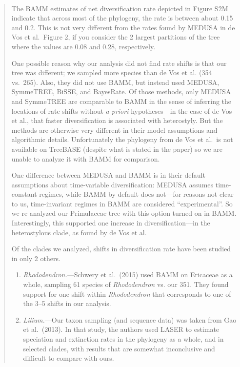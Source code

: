 \documentclass[11pt]{letter}
\begin{document}
\begin{letter}{ \\

}
\begin{enumerate}
  \begin{quote}
    The BAMM estimates of net diversification rate depicted in Figure
    S2M indicate that across most of the phylogeny, the rate is
    between about 0.15 and 0.2. This is not very different from the
    rates found by MEDUSA in de Vos et al.\ Figure 2, if you consider
    the 2 largest partitions of the tree where the values are 0.08 and
    0.28, respectively.

    One possible reason why our analysis did not find rate shifts is
    that our tree was different; we sampled more species than de Vos
    et al. (354 vs.\ 265). Also, they did not use BAMM, but instead
    used MEDUSA, SymmeTREE, BiSSE, and BayesRate. Of those methods,
    only MEDUSA and SymmeTREE are comparable to BAMM in the sense of
    inferring the locations of rate shifts without \textit{a priori}
    hypotheses---in the case of de Vos et al., that faster
    diversification is associated with heterostyly. But the methods
    are otherwise very different in their model assumptions and
    algorithmic details. Unfortunately the phylogeny from de Vos et
    al.\ is not available on TreeBASE (despite what is stated in the
    paper) so we are unable to analyze it with BAMM for comparison.

    One difference between MEDUSA and BAMM is in their default
    assumptions about time-variable diversification: MEDUSA assumes
    time-constant regimes, while BAMM by default does not---for
    reasons not clear to us, time-invariant regimes in BAMM are
    considered ``experimental''. So we re-analyzed our Primulaceae
    tree with this option turned on in BAMM. Interestingly, this
    supported one increase in diversification---in the heterostylous
    clade, as found by de Vos et al.

    Of the clades we analyzed, shifts in diversification rate have
    been studied in only 2 others.

    \begin{enumerate}[parsep=2pt,itemsep=2pt]
    \item \textit{Rhododendron.}---Schwery et al.\ (2015) used BAMM on
      Ericaceae as a whole, sampling 61 species of
      \textit{Rhododendron} vs. our 351. They found support for one
      shift within \textit{Rhododendron} that corresponds to one of
      the 3--5 shifts in our analysis.

    \item \textit{Lilium.}---Our taxon sampling (and sequence data)
      was taken from Gao et al.\ (2013). In that study, the authors
      used LASER to estimate speciation and extinction rates in the
      phylogeny as a whole, and in selected clades, with results that
      are somewhat inconclusive and difficult to compare with ours.
    \end{enumerate}


\end{quote}
\end{enumerate}
\end{letter}
\end{document}
